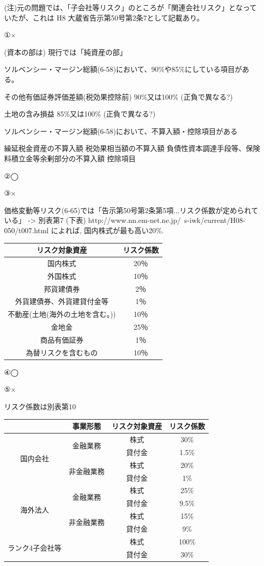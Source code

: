 \documentclass[report,gutter=10mm,fore-edge=10mm,uplatex,dvipdfmx]{jlreq}
\begin{document}
(注)元の問題では、「子会社等リスク」のところが「関連会社リスク」となっていたが、これは H8 大蔵省告示第50号第2条7として記載あり。


\answer{}

①×

(資本の部は) 現行では「純資産の部」

ソルベンシー・マージン総額(6-58)において、90\%や85\%にしている項目がある。

その他有価証券評価差額(税効果控除前) 90\%又は100\% (正負で異なる?)

土地の含み損益 85\%又は100\% (正負で異なる?)

ソルベンシー・マージン総額(6-58)において、不算入額・控除項目がある

繰延税金資産の不算入額
税効果相当額の不算入額
負債性資本調達手段等、保険料積立金等余剰部分の不算入額
控除項目

②◯

③×

価格変動等リスク(6-65)では「告示第50号第2条第5項...リスク係数が定められている」
-> 別表第7 (下表) http://www.nn.em-net.ne.jp/~s-iwk/current/H08-050/t007.html
によれば, 国内株式が最も高い20\%.

\begin{tabular}{|c|c|}
 \hline
リスク対象資産&リスク係数 \\ 
 \hline
国内株式	& 20％\\
外国株式	& 10％\\
邦貨建債券	& 2％\\
外貨建債券、外貨建貸付金等	& 1％\\
不動産(土地(海外の土地を含む。))  &	10％\\
金地金	& 25％\\
商品有価証券	& 1％\\
為替リスクを含むもの	& 10％\\
\hline
\end{tabular}

④◯

⑤×

リスク係数は別表第10

\begin{tabular}{|c|c|c|c|}
\hline
&事業形態 &リスク対象資産 &リスク係数\\
\hline
 \multirow{4}{*}{国内会社}&\multirow{2}{*}{金融業務} &株式 & 30\%\\
& &貸付金 & 1.5\%\\
\cline{2-4}
&\multirow{2}{*}{非金融業務} &株式 & 20\%\\
& &貸付金 & 1\%\\
\hline
 \multirow{4}{*}{海外法人}&\multirow{2}{*}{金融業務} &株式 & 25\%\\
& &貸付金 & 9.5\%\\
\cline{2-4}
&\multirow{2}{*}{非金融業務} &株式 & 15\%\\
& &貸付金 & 9\%\\
\hline
 \multirow{2}{*}{ランク4子会社等}& &株式 & 100\%\\
&&貸付金& 30\%\\
\hline
\end{tabular}
\end{document}
